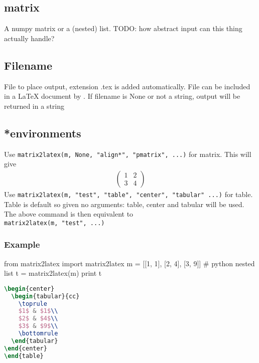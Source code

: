 \subsection{matrix}
  A numpy matrix or a (nested) list. TODO: how abstract input can this thing actually handle?

\subsection{Filename}
  File to place output, extension .tex is added automatically. File can be included in a LaTeX
  document by \verb!!. If filename is None or not a string, output will be returned in a string
  
\subsection{*environments}
  Use 
\lstinline{matrix2latex(m, None, "align*", "pmatrix", ...)} for matrix.
  This will give
  \begin{align*}
    \begin{pmatrix}
      1 & 2 \\
      3 & 4
    \end{pmatrix}
  \end{align*}
  Use 
\lstinline{matrix2latex(m, "test", "table", "center", "tabular" ...)} for table.
  Table is default so given no arguments: table, center and tabular will be used.
  The above command is then equivalent to \\
\lstinline{matrix2latex(m, "test", ...)}

\subsubsection{Example}
\begin{sageblock}
  from matrix2latex import matrix2latex
  m = [[1, 1], [2, 4], [3, 9]] # python nested list
  t = matrix2latex(m)
  print t
\end{sageblock}
\begin{lstlisting}[language=tex, morekeywords={begin}]
\begin{center}
  \begin{tabular}{cc}
    \toprule
    $1$ & $1$\\
    $2$ & $4$\\
    $3$ & $9$\\
    \bottomrule
  \end{tabular}
\end{center}
\end{table}
\end{lstlisting}

